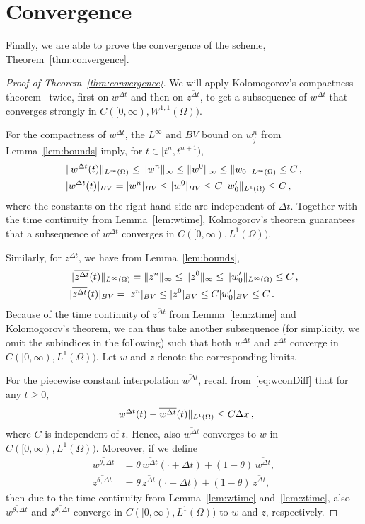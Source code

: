 \documentclass[11pt,leqno]{amsart}
\newcommand{\normInf}[1]{\norm{#1}_\infty}
\newcommand{\normLinf}[1]{\norm{#1}_{L^\infty(\Omega)}}
\newcommand{\normOne}[1]{\norm{#1}_1}
\newcommand{\normLone}[1]{\norm{#1}_{L^1(\Omega)}}
\newcommand{\normBV}[1]{\abs{#1}_{BV}}
\newcommand{\wlin}{w^{\Delta t}}
\newcommand{\wcon}{\overline{w^{\Delta t}}}
\newcommand{\wthcon}{\overline{w^{\theta,\Delta t}}}
\newcommand{\zthcon}{\overline{z^{\theta,\Delta t}}}
\newcommand{\zcon}{\overline{z^{\Delta t}}}
\DeclarePairedDelimiter\abs{\lvert}{\rvert}
\DeclarePairedDelimiter\norm{\lVert}{\rVert}
\begin{document}
\section{Convergence}\label{sec:convergence}
Finally, we are able to prove the convergence of the scheme, Theorem~\ref{thm:convergence}.
\begin{proof}[Proof of Theorem~\ref{thm:convergence}]
  We will apply Kolomogorov's compactness theorem~\cite[Thm.~A.11, p.~437]{HoldenRisebro-book} twice, first on $\wlin$ and then on $\zcon$, to get a subsequence of $\wlin$ that converges strongly in $C([0,\infty), W^{1,1}(\Omega))$.

For the compactness of $\wlin$, the $L^\infty$ and $BV$ bound on $w^n_j$ from Lemma~\ref{lem:bounds} imply, for $t\in[t^n,t^{n+1})$,
\begin{align*}
 & \normLinf{\wlin(t)}\le \normInf{w^n}\le \normInf{w^0}\le \normLinf{w_0}\le C\,,\\
&\normBV{\wlin(t)}=\normBV{w^n}\le \normBV{w^0}\le C \normLone{w_0'}\le C\,,
\end{align*}
where the constants on the right-hand side are independent of $\Delta t$.
Together with the time continuity from Lemma~\ref{lem:wtime}, Kolmogorov's theorem guarantees that a subsequence of $\wlin$ converges in $C([0,\infty), L^1(\Omega))$.

Similarly, for $\zcon$, we have from Lemma~\ref{lem:bounds},
\begin{align*}
 & \normLinf{\zcon(t)}=\normInf{z^n}\le \normInf{z^0}\le \normLinf{w'_0}\le C\,,\\
&\normBV{\zcon(t)}=\normBV{z^n}\le \normBV{z^0}\le C\normBV{w_0'}\le C\,.%
\end{align*}
Because of the time continuity of $\zcon$ from Lemma~\ref{lem:ztime} and Kolomogorov's theorem, we can thus take another subsequence (for simplicity, we omit the subindices in the following) such that both $\wlin$ and $\zcon$ converge in $C([0,\infty), L^1(\Omega))$. Let $w$ and $z$ denote the corresponding limits.

For the piecewise constant interpolation $\wcon$, recall from~\eqref{eq:wconDiff} that for any $t\ge 0$,
\begin{equation*}
  \normLone{\wlin(t)-\wcon(t)}\le C \Delta x\,,
\end{equation*}
where $C$ is independent of $t$. Hence, also $\wcon$ converges to $w$ in $C([0,\infty), L^1(\Omega))$. 
Moreover, if we define
\begin{align*}
  \wthcon&=\theta\, \wcon(\cdot+\Delta t)+(1-\theta)\,\wcon,\\
\zthcon&=\theta\,\zcon(\cdot+\Delta t)+ (1-\theta)\,\zcon,
\end{align*}
then due to the time continuity from Lemma~\ref{lem:wtime} and~\ref{lem:ztime}, also $\wthcon$ and $\zthcon$ converge in $C([0,\infty),L^1(\Omega))$ to $w$ and $z$, respectively.


\end{proof}
\end{document}
